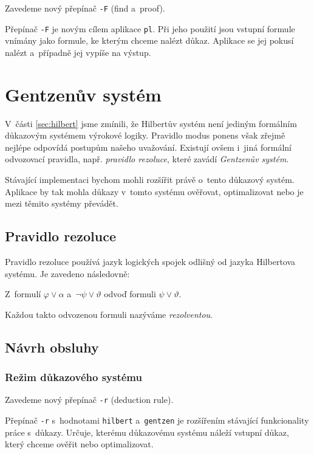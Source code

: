 \documentclass[thesis=B,czech,hidelinks]{thesis}[2012/06/26]
\begin{document}
Zavedeme nový přepínač \texttt{-F} (find a~proof).

Přepínač \texttt{-F} je novým cílem aplikace \texttt{pl}. Při jeho použití jsou vstupní formule vnímány jako formule, ke kterým chceme nalézt důkaz. Aplikace se jej pokusí nalézt a~případně jej vypíše na výstup.

\section{Gentzenův systém}
\label{sec:gentzen}

V~části \ref{sec:hilbert} jsme zmínili, že Hilbertův systém není jediným formálním důkazovým systémem výrokové logiky. Pravidlo modus ponens však zřejmě nejlépe odpovídá postupům našeho uvažování\cite{sochor}. Existují ovšem i~jiná formální odvozovací pravidla, např. \emph{pravidlo rezoluce}, které zavádí \emph{Gentzenův systém}.

Stávající implementaci bychom mohli rozšířit právě o~tento důkazový systém. Aplikace by tak mohla důkazy v~tomto systému ověřovat, optimalizovat nebo je mezi těmito systémy převádět.

\subsection{Pravidlo rezoluce}

Pravidlo rezoluce používá jazyk logických spojek odlišný od jazyka Hilbertova systému. Je zavedeno následovně\cite{stary}:

\begin{dfn}
Z~formulí $\varphi \vee \alpha$ a~$\neg \psi \vee \vartheta$ odvoď formuli $\psi \vee \vartheta$.
\end{dfn}

Každou takto odvozenou formuli nazýváme \emph{rezolventou}.

\subsection{Návrh obsluhy}

\subsubsection{Režim důkazového systému}

Zavedeme nový přepínač \texttt{-r} (deduction rule).

Přepínač \texttt{-r} s~hodnotami \texttt{hilbert} a~\texttt{gentzen} je rozšířením stávající funkcionality práce s~důkazy. Určuje, kterému důkazovému systému náleží vstupní důkaz, který chceme ověřit nebo optimalizovat.
\end{document}
